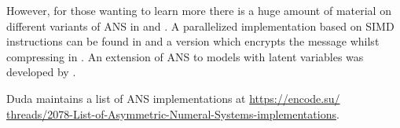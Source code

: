 \documentclass{article}
\begin{document}
However, for those wanting to learn more there is a huge amount of material on
different variants of ANS in \cite{dudaAsymmetricNumeralSystems2009} and
\cite{dudaUseAsymmetricNumeral2015a}. A parallelized implementation based on
SIMD instructions can be found in \cite{giesenInterleavedEntropyCoders2014} and
a version which encrypts the message whilst compressing in
\cite{dudaLightweightCompressionEncryption2016}. An extension of ANS to models
with latent variables was developed by
\cite{townsendPracticalLosslessCompression2019}.

Duda maintains a list of ANS implementations at
\url{
  https://encode.su/
  threads/2078-List-of-Asymmetric-Numeral-Systems-implementations}.
\printbibliography
\end{document}
